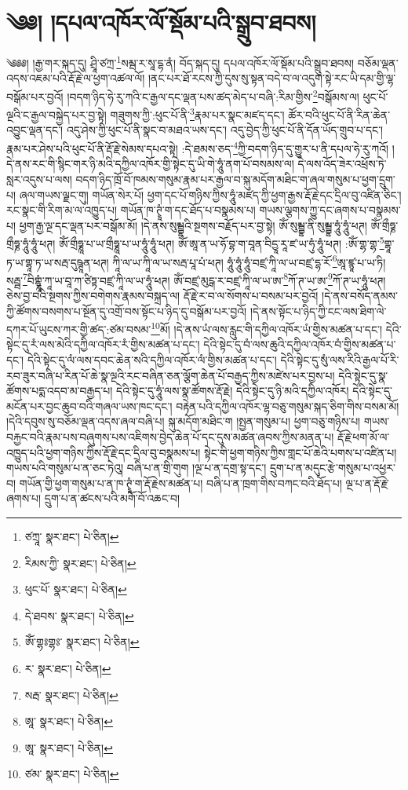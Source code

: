 \setcounter{footnote}{0} 
\chapter{༄༅། །དཔལ་འཁོར་ལོ་སྡོམ་པའི་སྒྲུབ་ཐབས།}༄༅༅། །རྒྱ་གར་སྐད་དུ། ཤྲཱི་ཙཀྲ་\footnote{ཙཀྲཱ་  སྣར་ཐང་།  པེ་ཅིན། }སམྦ་ར་སཱ་དྷ་ནཾ། བོད་སྐད་དུ། དཔལ་འཁོར་ལོ་སྡོམ་པའི་སྒྲུབ་ཐབས། བཅོམ་ལྡན་འདས་འཇམ་པའི་རྡོ་རྗེ་ལ་ཕྱག་འཚལ་ལོ། །ནང་པར་ཐོ་རངས་ཀྱི་དུས་སུ་སྟན་བདེ་བ་ལ་འདུག་སྟེ་རང་ཡི་དམ་གྱི་ལྷ་བསྒོམ་པར་བྱའོ། །བདག་ཉིད་ཧེ་རུ་ཀའི་ང་རྒྱལ་དང་ལྡན་པས་ཚད་མེད་པ་བཞི་:རིམ་གྱིས་\footnote{རིམས་ཀྱི་  སྣར་ཐང་།  པེ་ཅིན། }བསྒོམས་ལ། ཕུང་པོ་ལྔའི་ང་རྒྱལ་བསྐྱེད་པར་བྱ་སྟེ། གཟུགས་ཀྱི་:ཕུང་པོ་ནི་\footnote{ཕུང་པོ་  སྣར་ཐང་།  པེ་ཅིན། }རྣམ་པར་སྣང་མཛད་དང་། ཚོར་བའི་ཕུང་པོ་ནི་རིན་ཆེན་འབྱུང་ལྡན་དང་། འདུ་ཤེས་ཀྱི་ཕུང་པོ་ནི་སྣང་བ་མཐའ་ཡས་དང་། འདུ་བྱེད་ཀྱི་ཕུང་པོ་ནི་དོན་ཡོད་གྲུབ་པ་དང་། རྣམ་པར་ཤེས་པའི་ཕུང་པོ་ནི་རྡོ་རྗེ་སེམས་དཔའ་སྟེ། :དེ་ཐམས་ཅད་\footnote{དེ་ཐབས་  སྣར་ཐང་།  པེ་ཅིན། }ཀྱི་བདག་ཉིད་དུ་གྱུར་པ་ནི་དཔལ་ཧེ་རུ་ཀའོ། །དེ་ནས་རང་གི་སྙིང་གར་ཉི་མའི་དཀྱིལ་འཁོར་གྱི་སྟེང་དུ་ཡི་གེ་ཧཱུཾ་ནག་པོ་བསམས་ལ། དེ་ལས་འོད་ཟེར་འཕྲོས་ཏེ་སླར་འདུས་པ་ལས། བདག་ཉིད་ཁྲོ་བོ་ཁམས་གསུམ་རྣམ་པར་རྒྱལ་བ་སྐུ་མདོག་མཐིང་ག་ཞལ་གསུམ་པ་ཕྱག་དྲུག་པ། ཞལ་གཡས་ལྗང་གུ། གཡོན་སེར་པོ། ཕྱག་དང་པོ་གཉིས་ཀྱིས་ཧཱུཾ་མཛད་ཀྱི་ཕྱག་རྒྱས་རྡོ་རྗེ་དང་དྲིལ་བུ་འཛིན་ཅིང་། རང་སྣང་གི་རིག་མ་ལ་འཁྱུད་པ། གཡོན་ཁ་ཊྭཱཾ་ག་དང་ཐོད་པ་བསྣམས་པ། གཡས་ལྕགས་ཀྱུ་དང་ཞགས་པ་བསྣམས་པ། ཕྱག་རྒྱ་ལྔ་དང་ལྡན་པར་བསྒོམ་མོ། །དེ་ནས་སུམྦྷའི་སྔགས་བརྗོད་པར་བྱ་སྟེ། ཨོཾ་སུམྦྷ་ནི་སུམྦྷ་ཧཱུཾ་ཧཱུཾ་ཕཊ། ཨོཾ་གྲྀཧྞ་གྲྀཧྞ་ཧཱུཾ་ཧཱུཾ་ཕཊ། ཨོཾ་གྲྀཧྞཱ་པ་ཡ་གྲྀཧྞཱ་པ་ཡ་ཧཱུཾ་ཧཱུཾ་ཕཊ། ཨོཾ་ཨཱ་ན་ཡ་ཧོ་བྷ་ག་བཱན་བིདྱཱ་རཱ་ཛ་ཡ་ཧུཾ་ཧཱུཾ་ཕཊ། :ཨོཾ་གྷ་གྷ་\footnote{ཨོཾ་གྷཿགྷཿ་  སྣར་ཐང་།  པེ་ཅིན། }གྷཱ་ཏ་ཡ་གྷཱ་ཏ་ཡ་སརྦ་དུཥྚཱན་ཕཊ། ཀཱི་ལ་ཡ་ཀཱི་ལ་ཡ་སརྦ་པཱ་པཾ་ཕཊ། ཧཱུཾ་ཧཱུཾ་ཧཱུཾ་བཛྲ་ཀཱི་ལ་ཡ་བཛྲ་དྷ་རོ་\footnote{ར་  སྣར་ཐང་།  པེ་ཅིན། }ཨཱ་ཛྙཱ་པ་ཡ་ཏི། སརྦྦ་\footnote{སརྦ་  སྣར་ཐང་།  པེ་ཅིན། }བིགྷྣཱཾ་ཀཱ་ཡ་བཱ་ཀ་ཙིཏྟ་བཛྲ་ཀཱི་ལ་ཡ་ཧཱུཾ་ཕཊ། ཨོཾ་བཛྲ་མུངྒ་ར་བཛྲ་ཀཱི་ལ་ཡ་ཨ་\footnote{ཨཱ་  སྣར་ཐང་།  པེ་ཅིན། }ཀོ་ཊ་ཡ་ཨ་\footnote{ཨཱ་  སྣར་ཐང་།  པེ་ཅིན། }ཀོ་ཊ་ཡ་ཧཱུཾ་ཕཊ། ཅེས་བྱ་བའི་སྔགས་ཀྱིས་བགེགས་རྣམས་བསྐྲད་ལ། རྡོ་རྗེ་ར་བ་ལ་སོགས་པ་བསམ་པར་བྱའོ། །དེ་ནས་བསོད་ནམས་ཀྱི་ཚོགས་བསགས་པ་སྔོན་དུ་འགྲོ་བས་སྟོང་པ་ཉིད་དུ་བསྒོམ་པར་བྱའོ། །དེ་ནས་སྟོང་པ་ཉིད་ཀྱི་ངང་ལས་ཐིག་ལེ་དཀར་པོ་ཡུངས་ཀར་གྱི་ཚད་:ཙམ་བསམ་\footnote{ཙམ་  སྣར་ཐང་།  པེ་ཅིན། }མོ། །དེ་ནས་ཡཾ་ལས་རླུང་གི་དཀྱིལ་འཁོར་ཡཾ་གྱིས་མཚན་པ་དང་། དེའི་སྟེང་དུ་རཾ་ལས་མེའི་དཀྱིལ་འཁོར་རཾ་གྱིས་མཚན་པ་དང་། དེའི་སྟེང་དུ་བཾ་ལས་ཆུའི་དཀྱིལ་འཁོར་བཾ་གྱིས་མཚན་པ་དང་། དེའི་སྟེང་དུ་ལཾ་ལས་དབང་ཆེན་སའི་དཀྱིལ་འཁོར་ལཾ་གྱིས་མཚན་པ་དང་། དེའི་སྟེང་དུ་སུཾ་ལས་རིའི་རྒྱལ་པོ་རི་རབ་ཟུར་བཞི་པ་རིན་པོ་ཆེ་སྣ་ལྔའི་རང་བཞིན་ཅན་ལྕོག་ཆེན་པོ་བརྒྱད་ཀྱིས་མཛེས་པར་བྱས་པ། དེའི་སྟེང་དུ་སྣ་ཚོགས་པདྨ་འདབ་མ་བརྒྱད་པ། དེའི་སྟེང་དུ་ཧཱུཾ་ལས་སྣ་ཚོགས་རྡོ་རྗེ། དེའི་སྟེང་དུ་ཉི་མའི་དཀྱིལ་འཁོར། དེའི་སྟེང་དུ་མངོན་པར་བྱང་ཆུབ་བའི་གཞལ་ཡས་ཁང་དང་། བརྟེན་པའི་དཀྱིལ་འཁོར་ལྷ་བཅུ་གསུམ་སྐད་ཅིག་གིས་བསམ་མོ། །དེའི་དབུས་སུ་བཅོམ་ལྡན་འདས་ཞལ་བཞི་པ། སྐུ་མདོག་མཐིང་ག །སྤྱན་གསུམ་པ། ཕྱག་བཅུ་གཉིས་པ། གཡས་བརྐྱང་བའི་རྣམ་པས་བཞུགས་པས་འཇིགས་བྱེད་ཆེན་པོ་དང་དུས་མཚན་ཞབས་ཀྱིས་མནན་པ། རྡོ་རྗེ་ཕག་མོ་ལ་འཁྱུད་པའི་ཕྱག་གཉིས་ཀྱིས་རྡོ་རྗེ་དང་དྲིལ་བུ་བསྣམས་པ། སྟེང་གི་ཕྱག་གཉིས་ཀྱིས་གླང་པོ་ཆེའི་པགས་པ་འཛིན་པ། གཡས་པའི་གསུམ་པ་ན་ཅང་ཏེའུ། བཞི་པ་ན་གྲི་གུག །ལྔ་པ་ན་དགྲ་སྟ་དང་། དྲུག་པ་ན་མདུང་རྩེ་གསུམ་པ་འཕྱར་བ། གཡོན་གྱི་ཕྱག་གསུམ་པ་ན་ཁ་ཊྭཱཾ་ག་རྡོ་རྗེས་མཚན་པ། བཞི་པ་ན་ཁྲག་གིས་བཀང་བའི་ཐོད་པ། ལྔ་པ་ན་རྡོ་རྗེ་ཞགས་པ། དྲུག་པ་ན་ཚངས་པའི་མགོ་བོ་འཆང་བ། 